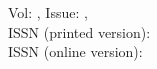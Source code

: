 

\noindent Vol: \emindsVolumeCount, Issue: \emindsVolumeNumber, \emindsVolumeDate \\
\noindent ISSN (printed version): \emindsISSNprinted \\
\noindent ISSN (online version): \emindsISSNonline \\

{\footnotesize

}

